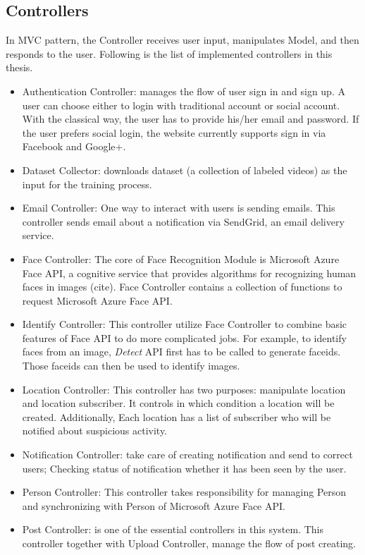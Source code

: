 \subsection{Controllers}
In MVC pattern, the Controller receives user input, manipulates Model, and then responds to the user. Following is the list of implemented controllers in this thesis.
\begin{itemize}
	\item Authentication Controller: manages the flow of user sign in and sign up. A user can choose either to login with traditional account or social account. With the classical way, the user has to provide his/her email and password. If the user prefers social login, the website currently supports sign in via Facebook and Google+.
	\item Dataset Collector: downloads dataset (a collection of labeled videos) as the input for the training process.
	\item Email Controller: One way to interact with users is sending emails. This controller sends email about a notification via SendGrid, an email delivery service.
	\item Face Controller: The core of Face Recognition Module is Microsoft Azure Face API, a cognitive service that provides algorithms for recognizing human faces in images (cite). Face Controller contains a collection of functions to request Microsoft Azure Face API.
	\item Identify Controller: This controller utilize Face Controller to combine basic features of Face API to do more complicated jobs. For example, to identify faces from an image, \textit{Detect} API first has to be called to generate faceids. Those faceids can then be used to identify images.
	\item Location Controller: This controller has two purposes: manipulate location and location subscriber. It controls in which condition a location will be created. Additionally, Each location has a list of subscriber who  will be notified about suspicious activity.
	\item Notification Controller:  take care of creating notification and send to correct users; Checking status of notification whether it has been seen by the user.
	\item Person Controller: This controller takes responsibility for managing Person and synchronizing with Person of Microsoft Azure Face API.
	\item Post Controller: is one of the essential controllers in this system. This controller together with Upload Controller, manage the flow of post creating.

\end{itemize}
